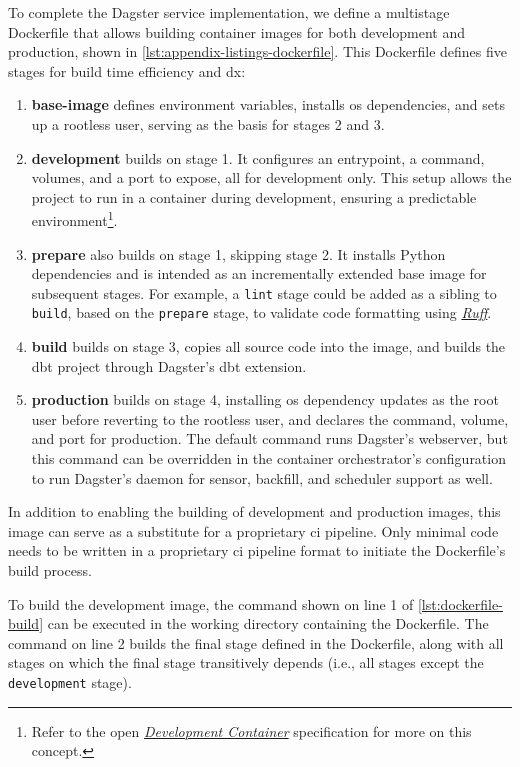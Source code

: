To complete the Dagster service implementation, we define a multistage Dockerfile that allows building container images for both development and production, shown in \cref{lst:appendix-listings-dockerfile}.
This Dockerfile defines five stages for build time efficiency and \ac{dx}:

\begin{enumerate}
  \item \textbf{base-image} defines environment variables, installs \ac{os} dependencies, and sets up a rootless user, serving as the basis for stages 2 and 3.
  \item \textbf{development} builds on stage 1. It configures an entrypoint, a command, volumes, and a port to expose, all for development only. This setup allows the project to run in a container during development, ensuring a predictable environment\footnote{Refer to the open \href{https://containers.dev/}{\textit{Development Container}} specification for more on this concept.}.
  \item \textbf{prepare} also builds on stage 1, skipping stage 2. It installs Python dependencies and is intended as an incrementally extended base image for subsequent stages. For example, a \texttt{lint} stage could be added as a sibling to \texttt{build}, based on the \texttt{prepare} stage, to validate code formatting using \href{https://docs.astral.sh/ruff/}{\textit{Ruff}}.
  \item \textbf{build} builds on stage 3, copies all source code into the image, and builds the dbt project through Dagster's dbt extension.
  \item \textbf{production} builds on stage 4, installing \ac{os} dependency updates as the root user before reverting to the rootless user, and declares the command, volume, and port for production. The default command runs Dagster's webserver, but this command can be overridden in the container orchestrator's configuration to run Dagster's daemon for sensor, backfill, and scheduler support as well.
\end{enumerate}

In addition to enabling the building of development and production images, this image can serve as a substitute for a proprietary \ac{ci} pipeline.
Only minimal code needs to be written in a proprietary \ac{ci} pipeline format to initiate the Dockerfile's build process.

To build the development image, the command shown on line 1 of \cref{lst:dockerfile-build} can be executed in the working directory containing the Dockerfile.
The command on line 2 builds the final stage defined in the Dockerfile, along with all stages on which the final stage transitively depends (i.e., all stages except the \texttt{development} stage).

